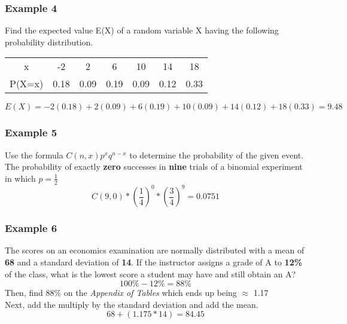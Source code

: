 \documentclass[]{article}
\newcommand{\bd}{\textbf}
\begin{document}
	\subsubsection*{Example 4}
	Find the expected value E(X) of a random variable X having the following probability distribution.
	\begin{center}
		\begin{tabular}{ |c|c|c|c|c|c|c| }
			\hline
				x & -2 & 2 & 6 & 10 & 14 & 18 \\
				P(X=x) & 0.18 & 0.09 & 0.19 & 0.09 & 0.12 & 0.33 \\
				\hline
		\end{tabular}
	\end{center}
	\begin{equation*}
		E(X) = -2(0.18) + 2(0.09) + 6(0.19) + 10(0.09) + 14(0.12) + 18(0.33) = 9.48
	\end{equation*}

	\subsubsection*{Example 5}
	Use the formula $C(n, x)p^xq^{n-x}$ to determine the probability of the given event. \\
	\indent The probability of exactly \bd{zero} successes in \bd{nine} trials of a binomial experiment in which $p = \frac{1}{2}$
	\begin{equation*}
		C(9, 0) * (\frac{1}{4})^0 * (\frac{3}{4})^9 = 0.0751
	\end{equation*}

	\subsubsection*{Example 6}
	The scores on an economics examination are normally distributed with a mean of \bd{68} and a standard deviation of \bd{14}. If the instructor assigns a grade of A to \bd{12\%} of the class, what is the lowest score a student may have and still obtain an A? \\
	\begin{equation*}
		100\% - 12\% = 88\%
	\end{equation*}
	Then, find 88\% on the \emph{Appendix of Tables} which ends up being $\approx$ 1.17 \\
	Next, add the multiply by the standard deviation and add the mean.
	\begin{equation*}
		68 + (1.175 * 14) = 84.45
	\end{equation*}
\end{document}
